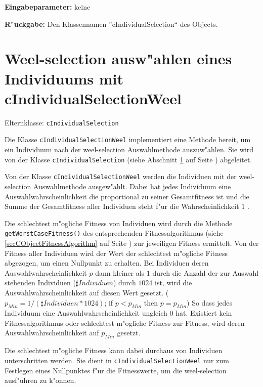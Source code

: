 \bigskip\noindent
\textbf{Eingabeparameter:} keine

\bigskip\noindent
\textbf{R"uckgabe:} Den Klassennamen ''cIndividualSelection`` des Objects.



\section{Weel-selection ausw"ahlen eines Individuums mit cIndividualSelectionWeel}
\label{secIndividualSelectionWeel}

Elternklasse: \verb|cIndividualSelection|

\bigskip\noindent
Die Klasse \verb|cIndividualSelectionWeel| implementiert eine Methode bereit, um ein Individuum nach der weel-selection Auswahlmethode auszuw"ahlen.
Sie wird von der Klasse \verb|cIndividualSelection| (siehe Abschnitt \ref{secIndividualSelectionWeel} auf Seite \pageref{secIndividualSelectionWeel} ) abgeleitet.

Von der Klasse \verb|cIndividualSelectionWeel| werden die Individuen mit der weel-selection Auswahlmethode ausgew"ahlt. Dabei hat jedes Individuum eine Auswahlwahrscheinlichkeit die proportional zu seiner Gesamtfitness ist und die Summe der Gesamtfitness aller Individuen steht f"ur die Wahrscheinlichkeit $1$ .

Die schlechtest m"ogliche Fitness von Individuen wird durch die Methode \verb|getWorstCaseFitness()| des entsprechenden Fitnessalgorithmus (siehe \ref{secCObjectFitnessAlgorithm} auf Seite \pageref{secCObjectFitnessAlgorithm}) zur jeweiligen Fitness ermittelt.
Von der Fitness aller Individuen wird der Wert der schlechtest m"ogliche Fitness abgezogen, um einen Nullpunkt zu erhalten. Bei Individuen deren Auswahlwahrscheinlichkeit $p$ dann kleiner als $1$ durch die Anzahl der zur Auswahl stehenden Individuen ($\sharp Individuen$) durch $1024$ ist, wird die Auswahlwahrscheinlichkeit auf diesen Wert gesetzt. ($p_{Min}=1/(\sharp Individuen * 1024)$; if $p < p_{Min}$ then $p=p_{Min}$) So dass jedes Individuum eine Auswahlwahrscheinlichkeit ungleich $0$ hat.
Existiert kein Fitnessalgorithmus oder schlechtest m"ogliche Fitness zur Fitness, wird deren Auswahlwahrscheinlichkeit auf $p_{Min}$ gesetzt.

Die schlechtest m"ogliche Fitness kann dabei durchaus von Individuen unterschritten werden. Sie dient in \verb|cIndividualSelectionWeel| nur zum Festlegen eines Nullpunktes f"ur die Fitnesswerte, um die weel-selection ausf"uhren zu k"onnen.



